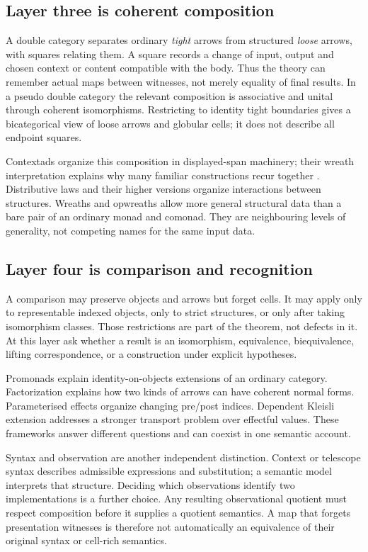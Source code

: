 \documentclass[11pt,letterpaper]{article}
\begin{document}
\subsection{Layer three is coherent composition}
A double category separates ordinary \emph{tight} arrows from structured \emph{loose} arrows, with squares relating them. A square records a change of input, output and chosen context or content compatible with the body. Thus the theory can remember actual maps between witnesses, not merely equality of final results. In a pseudo double category the relevant composition is associative and unital through coherent isomorphisms. Restricting to identity tight boundaries gives a bicategorical view of loose arrows and globular cells; it does not describe all endpoint squares.

Contextads organize this composition in displayed-span machinery; their wreath interpretation explains why many familiar constructions recur together \cite[Sections 3--4]{CM}. Distributive laws and their higher versions organize interactions between structures. Wreaths and opwreaths allow more general structural data than a bare pair of an ordinary monad and comonad. They are neighbouring levels of generality, not competing names for the same input data.

\subsection{Layer four is comparison and recognition}
A comparison may preserve objects and arrows but forget cells. It may apply only to representable indexed objects, only to strict structures, or only after taking isomorphism classes. Those restrictions are part of the theorem, not defects in it. At this layer ask whether a result is an isomorphism, equivalence, biequivalence, lifting correspondence, or a construction under explicit hypotheses.

Promonads explain identity-on-objects extensions of an ordinary category. Factorization explains how two kinds of arrows can have coherent normal forms. Parameterised effects organize changing pre/post indices. Dependent Kleisli extension addresses a stronger transport problem over effectful values. These frameworks answer different questions and can coexist in one semantic account.

Syntax and observation are another independent distinction. Context or telescope syntax describes admissible expressions and substitution; a semantic model interprets that structure. Deciding which observations identify two implementations is a further choice. Any resulting observational quotient must respect composition before it supplies a quotient semantics. A map that forgets presentation witnesses is therefore not automatically an equivalence of their original syntax or cell-rich semantics.
\end{document}
